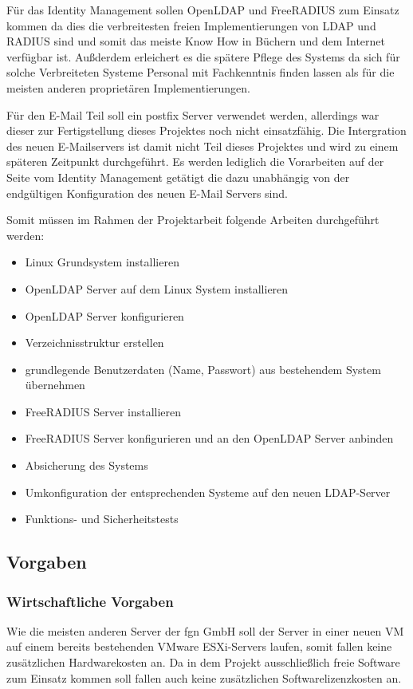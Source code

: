 \documentclass[11pt,a4paper,titlepage=firstiscover]{scrartcl} %
\begin{document}
Für das Identity Management sollen OpenLDAP und FreeRADIUS zum Einsatz kommen da dies die verbreitesten freien Implementierungen von LDAP und RADIUS sind und somit das meiste Know How in Büchern und dem Internet verfügbar ist. Au\ss{}derdem erleichert es die spätere Pflege des Systems da sich für solche Verbreiteten Systeme Personal mit Fachkenntnis finden lassen als für die meisten anderen proprietären Implementierungen.

Für den E-Mail Teil soll ein postfix Server verwendet werden, allerdings war dieser zur Fertigstellung dieses Projektes noch nicht einsatzfähig. Die Intergration des neuen E-Mailservers ist damit nicht Teil dieses Projektes und wird zu einem späteren Zeitpunkt durchgeführt. Es werden lediglich die Vorarbeiten auf der Seite vom Identity Management getätigt die dazu unabhängig von der endgültigen Konfiguration des neuen E-Mail Servers sind.\newline

\noindent 		%
Somit müssen im Rahmen der Projektarbeit folgende Arbeiten durchgeführt werden: 
\begin{itemize}
\item Linux Grundsystem installieren
\item OpenLDAP Server auf dem Linux System installieren
\item OpenLDAP Server konfigurieren
\item Verzeichnisstruktur erstellen
\item grundlegende Benutzerdaten (Name, Passwort) aus bestehendem System übernehmen
\item FreeRADIUS Server installieren
\item FreeRADIUS Server konfigurieren und an den OpenLDAP Server anbinden
\item Absicherung des Systems
\item Umkonfiguration der entsprechenden Systeme auf den neuen LDAP-Server
\item Funktions- und Sicherheitstests
\end{itemize}


\subsection{Vorgaben}
\subsubsection{Wirtschaftliche Vorgaben}
Wie die meisten anderen Server der fgn GmbH soll der Server in einer neuen VM auf einem bereits bestehenden VMware ESXi-Servers laufen, somit fallen keine zusätzlichen Hardwarekosten an. Da in dem Projekt  ausschlie\ss{}lich freie Software zum Einsatz kommen soll fallen auch keine zusätzlichen Softwarelizenzkosten an.
\end{document}
